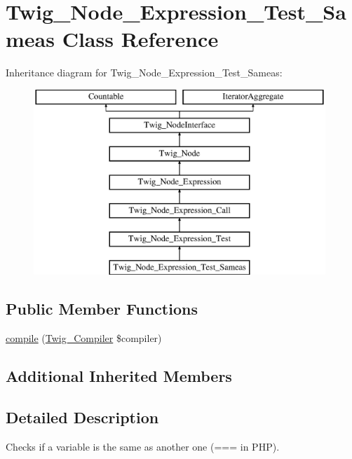 \hypertarget{class_twig___node___expression___test___sameas}{}\section{Twig\+\_\+\+Node\+\_\+\+Expression\+\_\+\+Test\+\_\+\+Sameas Class Reference}
\label{class_twig___node___expression___test___sameas}
Inheritance diagram for Twig\+\_\+\+Node\+\_\+\+Expression\+\_\+\+Test\+\_\+\+Sameas\+:\begin{figure}[H]
\begin{center}
\leavevmode
\includegraphics[height=7.000000cm]{class_twig___node___expression___test___sameas}
\end{center}
\end{figure}
\subsection*{Public Member Functions}
\begin{DoxyCompactItemize}
\item 
\hyperlink{class_twig___node___expression___test___sameas_a4e0faa87c3fae583620b84d3607085da}{compile} (\hyperlink{class_twig___compiler}{Twig\+\_\+\+Compiler} \$compiler)
\end{DoxyCompactItemize}
\subsection*{Additional Inherited Members}


\subsection{Detailed Description}
Checks if a variable is the same as another one (=== in P\+H\+P).

